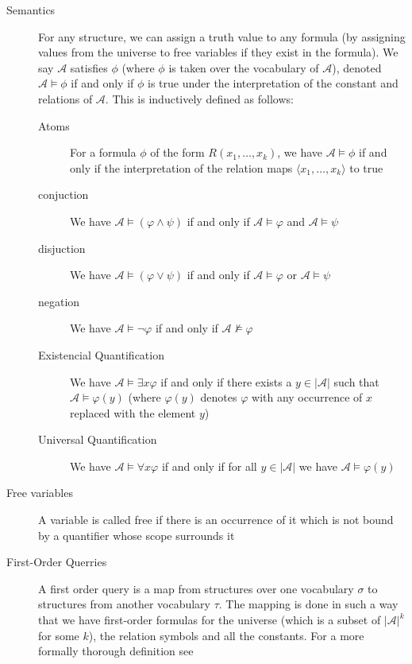 \begin{description}
\begin{description}
    \end{description}
    \item[Semantics] For any structure, we can assign a truth value to any formula (by assigning values from the universe to free variables if they exist in the formula). We say $\mathcal{A}$ satisfies $\phi$ (where $\phi$ is taken over the vocabulary of $\mathcal{A}$), denoted $\mathcal{A} \models \phi$ if and only if $\phi$ is true under the interpretation of the constant and relations of $\mathcal{A}$. This is inductively defined as follows:
    \begin{description}
        \item[Atoms] For a formula $\phi$ of the form $R(x_1, \dots, x_k)$, we have $\mathcal{A} \models \phi$ if and only if the interpretation of the relation maps $\langle x_1, \dots, x_k \rangle$ to true
        \item[conjuction] We have $\mathcal{A} \models (\varphi \land \psi)$ if and only if $\mathcal{A} \models \varphi$ and $\mathcal{A} \models \psi$
        \item[disjuction]  We have $\mathcal{A} \models (\varphi \lor \psi)$ if and only if $\mathcal{A} \models \varphi$ or $\mathcal{A} \models \psi$
        \item[negation] We have $\mathcal{A} \models \lnot \varphi$ if and only if $\mathcal{A} \not\models \varphi$
        \item[Existencial Quantification] We have $\mathcal{A} \models \exists x\varphi$ if and only if there exists a $y \in |\mathcal{A}|$ such that $\mathcal{A} \models \varphi(y)$ (where $\varphi(y)$ denotes $\varphi$ with any occurrence of $x$ replaced with the element $y$)
        \item[Universal Quantification] We have $\mathcal{A} \models \forall x\varphi$ if and only if for all $y \in |\mathcal{A}|$ we have $\mathcal{A} \models \varphi(y)$
    \end{description}
    \item[Free variables] A variable is called free if there is an occurrence of it which is not bound by a quantifier whose scope surrounds it
    \item[First-Order Querries] A first order query is a map from structures over one vocabulary $\sigma$ to structures from another vocabulary $\tau$.
    The mapping is done in such a way that we have first-order formulas for the universe (which is a subset of $|\mathcal{A}|^k$ for some $k$), the relation symbols and all the constants.
    For a more formally thorough definition see~\cite{descriptive-complexity}

\end{description}
